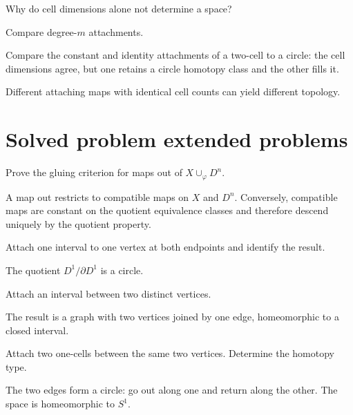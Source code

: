 \begin{exercise}\label{exr:viii05-24}
Why do cell dimensions alone not determine a space?
\end{exercise}
\begin{hint}
Compare degree-\(m\) attachments.

Compare the constant and identity attachments of a two-cell to a circle: the cell dimensions agree, but one retains a circle homotopy class and the other fills it.
\end{hint}
\begin{solution}
Different attaching maps with identical cell counts can yield different topology.
\end{solution}


\section{Solved problem extended problems}

\begin{problem}\label{prob:viii05-01}
Prove the gluing criterion for maps out of \(X\cup_\varphi D^n\).
\end{problem}
\begin{solution}
A map out restricts to compatible maps on \(X\) and \(D^n\). Conversely, compatible maps are constant on the quotient equivalence classes and therefore descend uniquely by the quotient property.
\end{solution}

\begin{problem}\label{prob:viii05-02}
Attach one interval to one vertex at both endpoints and identify the result.
\end{problem}
\begin{solution}
The quotient \(D^1/\partial D^1\) is a circle.
\end{solution}

\begin{problem}\label{prob:viii05-03}
Attach an interval between two distinct vertices.
\end{problem}
\begin{solution}
The result is a graph with two vertices joined by one edge, homeomorphic to a closed interval.
\end{solution}

\begin{problem}\label{prob:viii05-04}
Attach two one-cells between the same two vertices. Determine the homotopy type.
\end{problem}
\begin{solution}
The two edges form a circle: go out along one and return along the other.  The space is homeomorphic to \(S^1\).
\end{solution}

